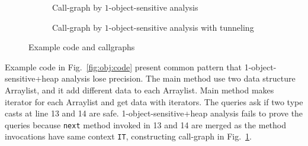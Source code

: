 \begin{figure}
\begin{multicols}{2}
\begin{subfigure}[b]{.9\columnwidth}
\begin{center}
{
}
\end{center}
\caption{Call-graph by $1$-object-sensitive analysis}
\label{fig:obj:callgraph}
\end{subfigure}
\vfill\null
\columnbreak
\begin{subfigure}[b]{.9\columnwidth}
\begin{center}

\end{center}
\caption{Call-graph by $1$-object-sensitive analysis with tunneling}
\label{fig:obj:tunneling}
\end{subfigure}
\end{multicols}
\setlength{\abovecaptionskip}{-5pt}
\caption{Example code and callgraphs}
\label{fig:overviewObj}
\end{figure}

Example code in Fig.~\ref{fig:obj:code} present common pattern that 1-object-sensitive+heap
analysis lose precision. The main method use two data structure Arraylist, and it add
different data to each Arraylist. Main method makes iterator for each Arraylist and 
get data with iterators. The queries ask if two type casts at line 13 and 14 are
safe. 1-object-sensitive+heap analysis fails to prove the queries because
\texttt{next} method invoked in 13 and 14 are merged as
the method invocations have same context \texttt{IT}, 
constructing call-graph in Fig.~\ref{fig:obj:callgraph}. 

